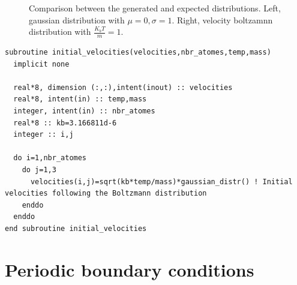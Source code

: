\documentclass{cis320}
\begin{document}
\begin{figure}[h]
    \centering
    \caption{Comparison between the generated and expected distributions. Left, gaussian distribution with $\mu=0,\sigma=1$. Right, velocity boltzamnn distribution with $\frac{K_bT}{m}=1$.}
    \label{fig:dist}
\end{figure}

\begin{lstlisting}[caption=Velocity initalization]
subroutine initial_velocities(velocities,nbr_atomes,temp,mass)
  implicit none

  real*8, dimension (:,:),intent(inout) :: velocities 
  real*8, intent(in) :: temp,mass
  integer, intent(in) :: nbr_atomes
  real*8 :: kb=3.166811d-6
  integer :: i,j

  do i=1,nbr_atomes
    do j=1,3
      velocities(i,j)=sqrt(kb*temp/mass)*gaussian_distr() ! Initial velocities following the Boltzmann distribution
    enddo
  enddo
end subroutine initial_velocities \end{lstlisting}

\section{Periodic boundary conditions}
\end{document}
